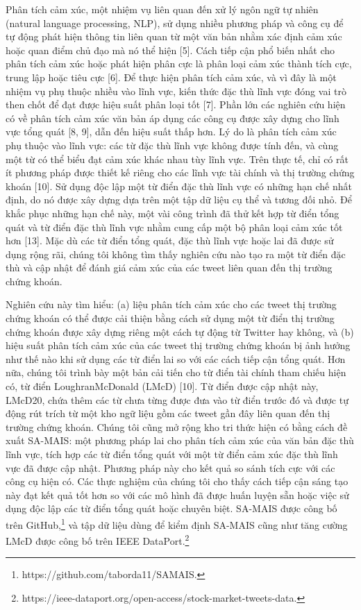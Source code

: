 Phân tích cảm xúc, một nhiệm vụ liên quan đến xử lý ngôn ngữ tự nhiên (natural language processing, NLP), sử dụng nhiều phương pháp và công cụ để tự động phát hiện thông tin liên quan từ một văn bản nhằm xác định cảm xúc hoặc quan điểm chủ đạo mà nó thể hiện [5]. Cách tiếp cận phổ biến nhất cho phân tích cảm xúc hoặc phát hiện phân cực là phân loại cảm xúc thành tích cực, trung lập hoặc tiêu cực [6]. Để thực hiện phân tích cảm xúc, và vì đây là một nhiệm vụ phụ thuộc nhiều vào lĩnh vực, kiến thức đặc thù lĩnh vực đóng vai trò then chốt để đạt được hiệu suất phân loại tốt [7]. Phần lớn các nghiên cứu hiện có về phân tích cảm xúc văn bản áp dụng các công cụ được xây dựng cho lĩnh vực tổng quát [8, 9], dẫn đến hiệu suất thấp hơn. Lý do là phân tích cảm xúc phụ thuộc vào lĩnh vực: các từ đặc thù lĩnh vực không được tính đến, và cùng một từ có thể biểu đạt cảm xúc khác nhau tùy lĩnh vực. Trên thực tế, chỉ có rất ít phương pháp được thiết kế riêng cho các lĩnh vực tài chính và thị trường chứng khoán [10]. Sử dụng độc lập một từ điển đặc thù lĩnh vực có những hạn chế nhất định, do nó được xây dựng dựa trên một tập dữ liệu cụ thể và tương đối nhỏ. Để khắc phục những hạn chế này, một vài công trình đã thử kết hợp từ điển tổng quát và từ điển đặc thù lĩnh vực nhằm cung cấp một bộ phân loại cảm xúc tốt hơn [13]. Mặc dù các từ điển tổng quát, đặc thù lĩnh vực hoặc lai đã được sử dụng rộng rãi, chúng tôi không tìm thấy nghiên cứu nào tạo ra một từ điển đặc thù và cập nhật để đánh giá cảm xúc của các tweet liên quan đến thị trường chứng khoán.

Nghiên cứu này tìm hiểu: (a) liệu phân tích cảm xúc cho các tweet thị trường chứng khoán có thể được cải thiện bằng cách sử dụng một từ điển thị trường chứng khoán được xây dựng riêng một cách tự động từ Twitter hay không, và (b) hiệu suất phân tích cảm xúc của các tweet thị trường chứng khoán bị ảnh hưởng như thế nào khi sử dụng các từ điển lai so với các cách tiếp cận tổng quát. Hơn nữa, chúng tôi trình bày một bản cải tiến cho từ điển tài chính tham chiếu hiện có, từ điển Loughran\textendash McDonald (LMcD) [10]. Từ điển được cập nhật này, LMcD20, chứa thêm các từ chưa từng được đưa vào từ điển trước đó và được tự động rút trích từ một kho ngữ liệu gồm các tweet gần đây liên quan đến thị trường chứng khoán. Chúng tôi cũng mở rộng kho tri thức hiện có bằng cách đề xuất SA-MAIS: một phương pháp lai cho phân tích cảm xúc của văn bản đặc thù lĩnh vực, tích hợp các từ điển tổng quát với một từ điển cảm xúc đặc thù lĩnh vực đã được cập nhật. Phương pháp này cho kết quả so sánh tích cực với các công cụ hiện có. Các thực nghiệm của chúng tôi cho thấy cách tiếp cận sáng tạo này đạt kết quả tốt hơn so với các mô hình đã được huấn luyện sẵn hoặc việc sử dụng độc lập các từ điển tổng quát hoặc chuyên biệt. SA-MAIS được công bố trên GitHub,\footnote{https://github.com/taborda11/SAMAIS.} và tập dữ liệu dùng để kiểm định SA-MAIS cũng như tăng cường LMcD được công bố trên IEEE DataPort.\footnote{https://ieee-dataport.org/open-access/stock-market-tweets-data.}

